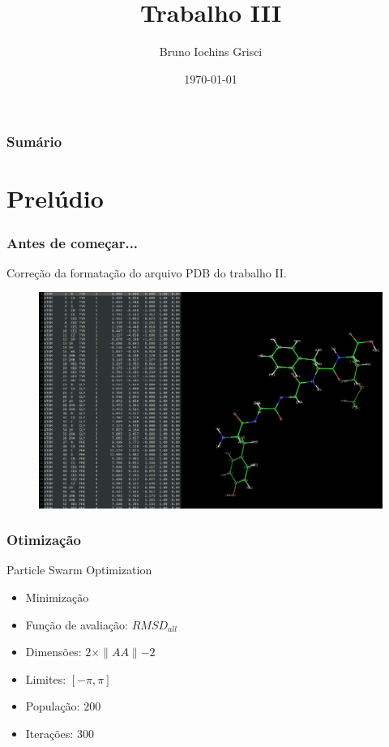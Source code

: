 \documentclass{beamer}
\title[T2]{Trabalho III} %
\author{Bruno Iochins Grisci} %
\institute[UFRGS] %
{
Universidade Federal do Rio Grande do Sul \\ %
\medskip
\textit{bigrisci@inf.ufrgs.br} %
}
\date{\today} %
\begin{document}
\begin{frame}
\titlepage %
\end{frame}

\begin{frame}
\frametitle{Sumário} %
\tableofcontents %
\end{frame}


\section{Prelúdio}

\begin{frame}
\frametitle{Antes de começar...}
Correção da formatação do arquivo PDB do trabalho II.
\begin{figure}
\includegraphics[width=0.9\linewidth]{1PLX-P.png}
\end{figure}
\end{frame}

\begin{frame}
\frametitle{Otimização}
Particle Swarm Optimization
\begin{itemize}
  \item Minimização
  \item Função de avaliação: $RMSD_{all}$
  \item Dimensões: $2 \times \parallel AA \parallel - 2$
  \item Limites: $[-\pi, \pi]$
  \item População: $200$
  \item Iterações: $300$
\end{itemize}
\end{frame}
\end{document}
